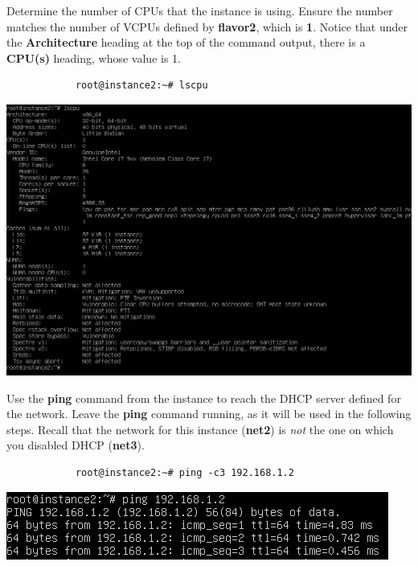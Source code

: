 \documentclass[letterpaper, 12pt]{article}
\begin{document}
\begin{enumerate}
    \begin{labstep}
        Determine the number of CPUs that the instance is using.
        Ensure the number matches the number of VCPUs defined by \textbf{flavor2}, which is \textbf{1}.
        Notice that under the \textbf{Architecture} heading at the top of the command output, there is a \textbf{CPU(s)} heading, whose value is 1. %
        \begin{lstlisting}
            root@instance2:~# lscpu
        \end{lstlisting}

        \begin{center}
            \includegraphics[width=\linewidth]{images/part5/step9.png}
        \end{center}
    \end{labstep}

    \begin{labstep}
        Use the \textbf{ping} command from the instance to reach the DHCP server defined for the network.
        Leave the \textbf{ping} command running, as it will be used in the following steps.
        Recall that the network for this instance (\textbf{net2}) is \textit{not} the one on which you disabled DHCP (\textbf{net3}).
        \begin{lstlisting}
            root@instance2:~# ping -c3 192.168.1.2
        \end{lstlisting}

        \begin{center}
            \includegraphics[width=\linewidth]{images/part5/step10.png}
        \end{center}
    \end{labstep}


\end{enumerate}
\end{document}
